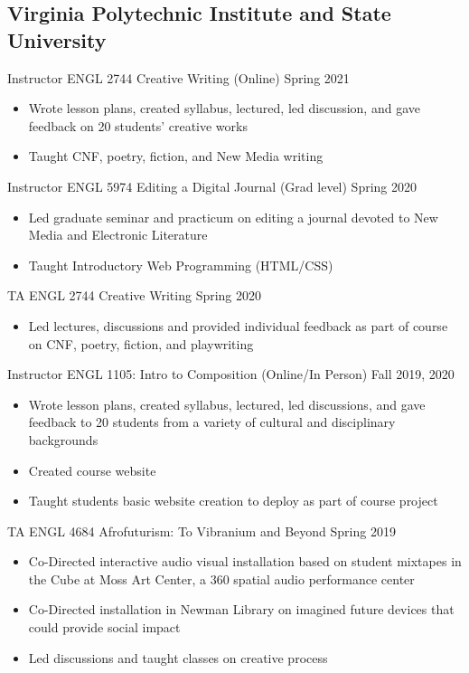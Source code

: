 \subsection{Virginia Polytechnic Institute and State University}
  
Instructor ENGL 2744 Creative Writing (Online) \hfill Spring 2021\\
\begin{itemize} 
\item Wrote lesson plans, created syllabus, lectured, led discussion, and gave feedback on 20 students' creative works 
\item Taught CNF, poetry, fiction, and New Media writing
\end{itemize} 
Instructor ENGL 5974 Editing a Digital Journal (Grad level) \hfill Spring 2020 \\
\begin{itemize}
\item Led graduate seminar and practicum on editing a journal devoted to New Media and Electronic Literature
\item Taught Introductory Web Programming (HTML/CSS)
\end{itemize}
TA ENGL 2744 Creative Writing \hfill Spring 2020\\
\begin{itemize}
\item Led lectures, discussions and provided individual feedback as part of course on CNF, poetry, fiction, and playwriting
\end{itemize}
Instructor ENGL 1105: Intro to Composition (Online/In Person) \hfill Fall 2019, 2020\\
\begin{itemize}
\item Wrote lesson plans, created syllabus, lectured, led discussions, and gave feedback to 20 students from a variety of cultural and disciplinary backgrounds
\item Created course website
\item Taught students basic website creation to deploy as part of course project
\end{itemize}
TA ENGL 4684 Afrofuturism: To Vibranium and Beyond \hfill Spring 2019 \\
\begin{itemize}
\item Co-Directed interactive audio visual installation based on student mixtapes in the Cube at Moss Art Center, a 360 spatial audio performance center 
\item Co-Directed installation in Newman Library on imagined future devices that could provide social impact
\item Led discussions and taught classes on creative process \\
\end{itemize} 